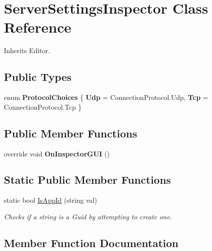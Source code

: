 \hypertarget{class_server_settings_inspector}{}\section{Server\+Settings\+Inspector Class Reference}
\label{class_server_settings_inspector}


Inherits Editor.

\subsection*{Public Types}
\begin{DoxyCompactItemize}
\item 
enum {\bfseries Protocol\+Choices} \{ {\bfseries Udp} = Connection\+Protocol.\+Udp, 
{\bfseries Tcp} = Connection\+Protocol.\+Tcp
 \}\hypertarget{class_server_settings_inspector_a926f762456cae88ef59d1b1a948e9ff0}{}\label{class_server_settings_inspector_a926f762456cae88ef59d1b1a948e9ff0}

\end{DoxyCompactItemize}
\subsection*{Public Member Functions}
\begin{DoxyCompactItemize}
\item 
override void {\bfseries On\+Inspector\+G\+UI} ()\hypertarget{class_server_settings_inspector_a8700b5c9f2191179a4eb9af443e8297d}{}\label{class_server_settings_inspector_a8700b5c9f2191179a4eb9af443e8297d}

\end{DoxyCompactItemize}
\subsection*{Static Public Member Functions}
\begin{DoxyCompactItemize}
\item 
static bool \hyperlink{class_server_settings_inspector_a6741c24491cc0260e444d05629ff4871}{Is\+App\+Id} (string val)
\begin{DoxyCompactList}\small\item\em Checks if a string is a Guid by attempting to create one. \end{DoxyCompactList}\end{DoxyCompactItemize}


\subsection{Member Function Documentation}
